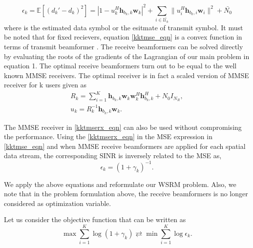 \begin{equation}
\epsilon_k = \mathbb{E} \left[ (d_k' - d_k)^2\right] = |1 - u_k^H \mathbf{h}_{{b_k},k} \mathbf{w}_k|^2 + \sum_{i \in \bar{\mathcal{U}_b}} \|u_i^H \mathbf{h}_{{b_k},i} \mathbf{w}_i\|^2 + \bar{N_0}
\label{kktmse_eqn}
\end{equation}
where  is the estimated data symbol or the esitmate of transmit symbol. It must be noted that for fixed recievers, equation \eqref{kktmse_eqn} is a convex function in terms of transmit beamformer . The receive beamformers  can be solved directly by evaluating the roots of the gradients of the Lagrangian of our main problem in equation 1. The optimal receive beamformers turn out to be equal to the well known \ac{MMSE} receivers. The optimal receiver is in fact a scaled version of \ac{MMSE} receiver for k users given as
\begin{eqnarray}
R_k = \sum_{i=1}^K \mathbf{h}_{{b_k},k} \mathbf{w}_k \mathbf{w}_k^H \mathbf{h}_{{b_k},k}^H + N_0 I_{N_R},  \nonumber \\
u_k = R_k^{-1} \mathbf{h}_{{b_k},k} \mathbf{w}_k.
\label{kktmserx_eqn}
\end{eqnarray}

The \ac{MMSE} receiver in \eqref{kktmserx_eqn} can also be used without compromising the performance. Using the \eqref{kktmserx_eqn} in the \ac{MSE} expression in \eqref{kktmse_eqn} and when \ac{MMSE} receive beamformers are applied for each spatial data stream, the corresponding \ac{SINR} is inversely related to the \ac{MSE} as,
\begin{equation}
\epsilon_k = \left(1 + \gamma_k\right)^{-1}.
\end{equation}

We apply the above equations and reformulate our \ac{WSRM} problem. Also, we note that in the problem formulation above, the receive beamformers is no longer considered as optimization variable. 

Let us consider the objective function that can be written as
\begin{equation}
\displaystyle \max \sum_{i=1}^{K} \log{(1 + \gamma_k)} \rightleftarrows \displaystyle \min \sum_{i=1}^{K} \log{\epsilon_k}.
\end{equation}  

